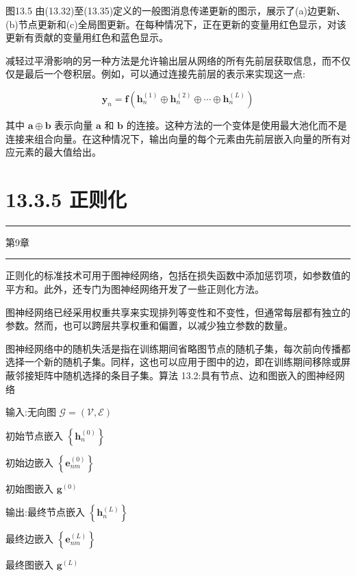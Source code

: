\documentclass[10pt]{article}
\newcommand{\HRule}{\begin{center}\rule{0.9\linewidth}{0.2mm}\end{center}}
\begin{document}
图13.5 由(13.32)至(13.35)定义的一般图消息传递更新的图示，展示了(a)边更新、(b)节点更新和(c)全局图更新。在每种情况下，正在更新的变量用红色显示，对该更新有贡献的变量用红色和蓝色显示。

减轻过平滑影响的另一种方法是允许输出层从网络的所有先前层获取信息，而不仅仅是最后一个卷积层。例如，可以通过连接先前层的表示来实现这一点:

\[
{\mathbf{y}}_{n} = \mathbf{f}\left( {{\mathbf{h}}_{n}^{\left( 1\right) } \oplus  {\mathbf{h}}_{n}^{\left( 2\right) } \oplus  \cdots  \oplus  {\mathbf{h}}_{n}^{\left( L\right) }}\right)  \tag{13.37}
\]

其中 \(\mathbf{a} \oplus  \mathbf{b}\) 表示向量 \(\mathbf{a}\) 和 \(\mathbf{b}\) 的连接。这种方法的一个变体是使用最大池化而不是连接来组合向量。在这种情况下，输出向量的每个元素由先前层嵌入向量的所有对应元素的最大值给出。

\section*{13.3.5 正则化}

\HRule

第9章

\HRule

正则化的标准技术可用于图神经网络，包括在损失函数中添加惩罚项，如参数值的平方和。此外，还专门为图神经网络开发了一些正则化方法。

图神经网络已经采用权重共享来实现排列等变性和不变性，但通常每层都有独立的参数。然而，也可以跨层共享权重和偏置，以减少独立参数的数量。

图神经网络中的随机失活是指在训练期间省略图节点的随机子集，每次前向传播都选择一个新的随机子集。同样，这也可以应用于图中的边，即在训练期间移除或屏蔽邻接矩阵中随机选择的条目子集。算法 13.2:具有节点、边和图嵌入的图神经网络

输入:无向图 \(\mathcal{G} = \left( {\mathcal{V},\mathcal{E}}\right)\)

初始节点嵌入 \(\left\{  {\mathbf{h}}_{n}^{\left( 0\right) }\right\}\)

初始边嵌入 \(\left\{  {\mathbf{e}}_{nm}^{\left( 0\right) }\right\}\)

初始图嵌入 \({\mathbf{g}}^{\left( 0\right) }\)

输出:最终节点嵌入 \(\left\{  {\mathbf{h}}_{n}^{\left( L\right) }\right\}\)

最终边嵌入 \(\left\{  {\mathbf{e}}_{nm}^{\left( L\right) }\right\}\)

最终图嵌入 \({\mathbf{g}}^{\left( L\right) }\)
\end{document}

